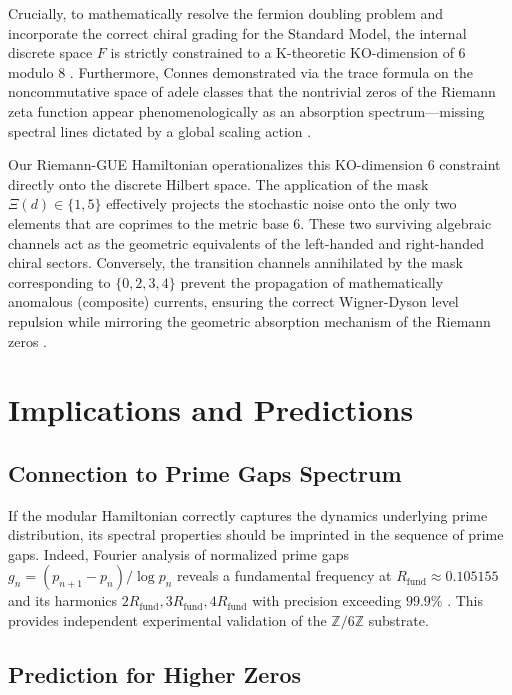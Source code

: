 \documentclass[prl,aps,floatfix,superscriptaddress,10pt]{revtex4-2}
\newcommand{\Zmod}{\mathbb{Z}/6\mathbb{Z}}
\newcommand{\Rfund}{R_{\text{fund}}}
\begin{document}
Crucially, to mathematically resolve the fermion doubling problem and incorporate the correct chiral grading for the Standard Model, the internal discrete space $F$ is strictly constrained to a K-theoretic KO-dimension of 6 modulo 8 \cite{Connes2008, Barrett2006}. Furthermore, Connes demonstrated via the trace formula on the noncommutative space of adele classes that the nontrivial zeros of the Riemann zeta function appear phenomenologically as an absorption spectrum---missing spectral lines dictated by a global scaling action \cite{Connes1999}.

Our Riemann-GUE Hamiltonian operationalizes this KO-dimension 6 constraint directly onto the discrete Hilbert space. The application of the mask $\Xi(d) \in \{1,5\}$ effectively projects the stochastic noise onto the only two elements that are coprimes to the metric base 6. These two surviving algebraic channels act as the geometric equivalents of the left-handed and right-handed chiral sectors. Conversely, the transition channels annihilated by the mask corresponding to $\{0, 2, 3, 4\}$ prevent the propagation of mathematically anomalous (composite) currents, ensuring the correct Wigner-Dyson level repulsion while mirroring the geometric absorption mechanism of the Riemann zeros \cite{Connes1999}.

\section{Implications and Predictions}

\subsection{Connection to Prime Gaps Spectrum}

If the modular Hamiltonian correctly captures the dynamics underlying prime distribution, its spectral properties should be imprinted in the sequence of prime gaps.
Indeed, Fourier analysis of normalized prime gaps $g_n = (p_{n+1}-p_n)/\log p_n$ reveals a fundamental frequency at $\Rfund \approx 0.105155$ and its harmonics $2\Rfund, 3\Rfund, 4\Rfund$ with precision exceeding $99.9\%$ \cite{PeinadorGenesis}.
This provides independent experimental validation of the $\Zmod$ substrate.

\subsection{Prediction for Higher Zeros}
\end{document}
